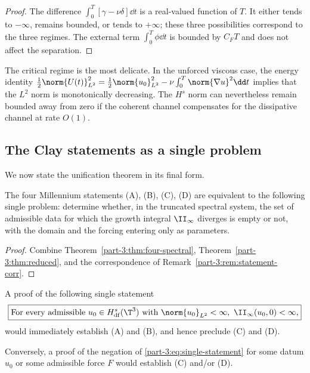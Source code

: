 \begin{proof}
The difference $\int_0^T[\gamma-\nu\delta]\dd t$ is a real-valued 
function of $T$. It either tends to $-\infty$, remains bounded, or 
tends to $+\infty$; these three possibilities correspond to the three 
regimes. The external term $\int_0^T\phi\dd t$ is bounded by $C_F T$ 
and does not affect the separation.
\end{proof}

\begin{remark}\label{part-3:rem:critical-regime}
The critical regime is the most delicate. In the unforced viscous 
case, the energy identity $\tfrac12\norm{U(t)}_{L^2}^2 = 
\tfrac12\norm{u_0}_{L^2}^2 - \nu\int_0^T\norm{\nabla u}^2\dd t$ 
implies that the $L^2$ norm is monotonically decreasing. The $H^s$ 
norm can nevertheless remain bounded away from zero if the coherent 
channel compensates for the dissipative channel at rate $O(1)$.
\end{remark}

\subsection{The Clay statements as a single problem}
\label{part-3:ssec:single-problem}

We now state the unification theorem in its final form.

\begin{theorem}[Unification]\label{part-3:thm:unification}
The four Millennium statements (A), (B), (C), (D) are equivalent to 
the following single problem: determine whether, in the truncated 
spectral system, the set of admissible data for which the growth 
integral $\II_\infty$ diverges is empty or not, with the domain and 
the forcing entering only as parameters.
\end{theorem}

\begin{proof}
Combine Theorem~\ref{part-3:thm:four-spectral}, Theorem~\ref{part-3:thm:reduced}, 
and the correspondence of Remark~\ref{part-3:rem:statement-corr}.
\end{proof}

\begin{corollary}\label{part-3:cor:four-corollaries}
A proof of the following single statement
\begin{equation}\label{part-3:eq:single-statement}
\boxed{
\text{For every admissible }u_0\in H^s_{\mathrm{df}}(\T^3)\text{ with 
}\norm{u_0}_{L^2}<\infty,\ \II_\infty(u_0,0)<\infty,
}
\end{equation}
would immediately establish (A) and (B), and hence preclude (C) and (D).

Conversely, a proof of the negation of \eqref{part-3:eq:single-statement} for 
some datum $u_0$ or some admissible force $F$ would establish (C) 
and/or (D).
\end{corollary}


